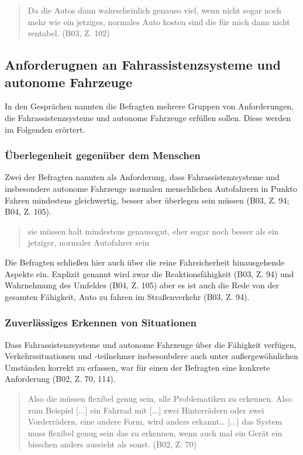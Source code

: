 \documentclass[12pt]{article}
\begin{document}
\begin{quote}
  Da die Autos dann wahrscheinlich genauso viel, wenn nicht sogar noch mehr wie ein jetziges, normales Auto kosten sind die für mich dann nicht rentabel. (B03, Z. 102)
\end{quote}


\subsection{Anforderugnen an Fahrassistenzsysteme und autonome Fahrzeuge}
In den Gesprächen nannten die Befragten mehrere Gruppen von Anforderungen, die Fahrassistenzsysteme und autonome Fahrzeuge erfüllen sollen. Diese werden im Folgenden erörtert.

\subsubsection*{Überlegenheit gegenüber dem Menschen}
Zwei der Befragten nannten als Anforderung, dass Fahrassistenzsysteme und insbesondere autonome Fahrzeuge normalen menschlichen Autofahrern in Punkto Fahren mindestens gleichwertig, besser aber überlegen sein müssen (B03, Z. 94; B04, Z. 105).

\begin{quote}
  sie müssen halt mindestens genausogut, eher sogar noch besser als ein jetziger, normaler Autofahrer sein
\end{quote}

Die Befragten schließen hier auch über die reine Fahrsicherheit hinausgehende Aspekte ein. Explizit genannt wird zwar die Reaktionsfähigkeit (B03, Z. 94) und Wahrnehmung des Umfeldes (B04, Z. 105) aber es ist auch die Rede von \glqq der gesamten Fähigkeit, Auto zu fahren im Straßenverkehr\grqq{} (B03, Z. 94).

\subsubsection*{Zuverlässiges Erkennen von Situationen}
Dass Fahrassistenzsysteme und autonome Fahrzeuge über die Fähigkeit verfügen, Verkehrssituationen und -teilnehmer insbesonbdere auch unter außergewöhnlichen Umständen korrekt zu erfassen, war für einen der Befragten eine konkrete Anforderung (B02, Z. 70, 114).

\begin{quote}
  Also die müssen flexibel genug sein, alle Problematiken zu erkennen. Also zum Beispiel [...] ein Fahrrad mit [...] zwei Hinterrädern oder zwei Vorderrädern, eine andere Form, wird anders erkannt… [...] das System muss flexibel genug sein das zu erkennen, wenn auch mal ein Gerät ein bisschen anders aussieht als sonst. (B02, Z. 70)
\end{quote}
\end{document}
